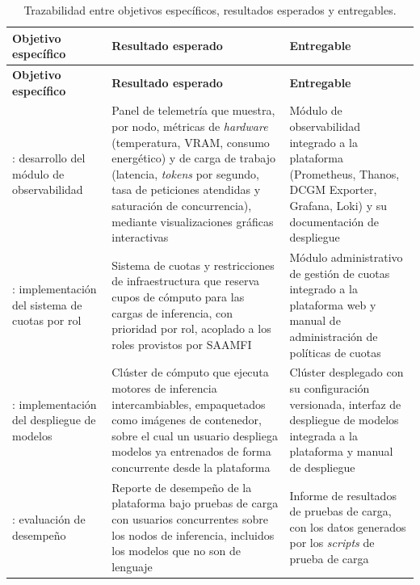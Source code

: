 \begin{xltabular}{\textwidth}{p{0.18\textwidth} X X}
        \caption{Trazabilidad entre objetivos específicos, resultados esperados y entregables.}
        \label{tab:objetivos-entregables} \\
        \toprule
        \textbf{Objetivo específico} & \textbf{Resultado esperado} & \textbf{Entregable} \\
        \midrule
        \endfirsthead
        \toprule
        \textbf{Objetivo específico} & \textbf{Resultado esperado} & \textbf{Entregable} \\
        \midrule
        \endhead
        \bottomrule
        \endfoot
        : desarrollo del módulo de observabilidad &
        Panel de telemetría que muestra, por nodo, métricas de \emph{hardware} (temperatura, VRAM, consumo energético) y de carga de trabajo (latencia, \emph{tokens} por segundo, tasa de peticiones atendidas y saturación de concurrencia), mediante visualizaciones gráficas interactivas &
        Módulo de observabilidad integrado a la plataforma (Prometheus, Thanos, DCGM Exporter, Grafana, Loki) y su documentación de despliegue \\
        \addlinespace
        : implementación del sistema de cuotas por rol &
        Sistema de cuotas y restricciones de infraestructura que reserva cupos de cómputo para las cargas de inferencia, con prioridad por rol, acoplado a los roles provistos por SAAMFI &
        Módulo administrativo de gestión de cuotas integrado a la plataforma web y manual de administración de políticas de cuotas \\
        \addlinespace
        : implementación del despliegue de modelos &
        Clúster de cómputo que ejecuta motores de inferencia intercambiables, empaquetados como imágenes de contenedor, sobre el cual un usuario despliega modelos ya entrenados de forma concurrente desde la plataforma &
        Clúster desplegado con su configuración versionada, interfaz de despliegue de modelos integrada a la plataforma y manual de despliegue \\
        \addlinespace
        : evaluación de desempeño &
        Reporte de desempeño de la plataforma bajo pruebas de carga con usuarios concurrentes sobre los nodos de inferencia, incluidos los modelos que no son de lenguaje &
        Informe de resultados de pruebas de carga, con los datos generados por los \emph{scripts} de prueba de carga \\
\end{xltabular}

